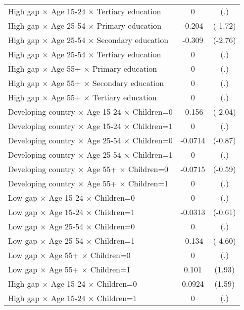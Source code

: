 {\begin{longtable}{l*{1}{cc}}
High gap $\times$ Age 15-24 $\times$ Tertiary education&           0         &         (.)\\
High gap $\times$ Age 25-54 $\times$ Primary education&      -0.204         &     (-1.72)\\
High gap $\times$ Age 25-54 $\times$ Secondary education&      -0.309\sym{**} &     (-2.76)\\
High gap $\times$ Age 25-54 $\times$ Tertiary education&           0         &         (.)\\
High gap $\times$ Age 55+ $\times$ Primary education&           0         &         (.)\\
High gap $\times$ Age 55+ $\times$ Secondary education&           0         &         (.)\\
High gap $\times$ Age 55+ $\times$ Tertiary education&           0         &         (.)\\
Developing country $\times$ Age 15-24 $\times$ Children=0&      -0.156\sym{*}  &     (-2.04)\\
Developing country $\times$ Age 15-24 $\times$ Children=1&           0         &         (.)\\
Developing country $\times$ Age 25-54 $\times$ Children=0&     -0.0714         &     (-0.87)\\
Developing country $\times$ Age 25-54 $\times$ Children=1&           0         &         (.)\\
Developing country $\times$ Age 55+ $\times$ Children=0&     -0.0715         &     (-0.59)\\
Developing country $\times$ Age 55+ $\times$ Children=1&           0         &         (.)\\
Low gap $\times$ Age 15-24 $\times$ Children=0&           0         &         (.)\\
Low gap $\times$ Age 15-24 $\times$ Children=1&     -0.0313         &     (-0.61)\\
Low gap $\times$ Age 25-54 $\times$ Children=0&           0         &         (.)\\
Low gap $\times$ Age 25-54 $\times$ Children=1&      -0.134\sym{***}&     (-4.60)\\
Low gap $\times$ Age 55+ $\times$ Children=0&           0         &         (.)\\
Low gap $\times$ Age 55+ $\times$ Children=1&       0.101         &      (1.93)\\
High gap $\times$ Age 15-24 $\times$ Children=0&      0.0924         &      (1.59)\\
High gap $\times$ Age 15-24 $\times$ Children=1&           0         &         (.)\\

\end{longtable}}
